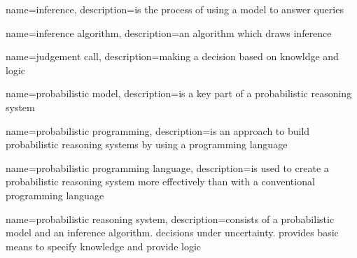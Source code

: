 {
  name=inference,
  description={is the process of using a model to answer queries \cite{9781617292330}}
}

{
  name=inference algorithm,
  description={an algorithm which draws \gls{inference}}
}

{
  name=judgement call,
  description={making a decision based on knowldge and logic \cite{9781617292330}}
}

{
  name=probabilistic model,
  description={is a key part of a \gls{probabilistic reasoning system}}
}

{
  name=probabilistic programming,
  description={is an approach to build \gls{probabilistic reasoning system}s by using a programming language }
}

{
  name=probabilistic programming language,
  description={is used to create a \gls{probabilistic reasoning system} more effectively than with a conventional programming language}
}

{
  name=probabilistic reasoning system,
  description={consists of a \gls{probabilistic model} and an \gls{inference algorithm}. decisions under uncertainty. provides basic means to specify knowledge and provide logic \cite{9781617292330}}
}